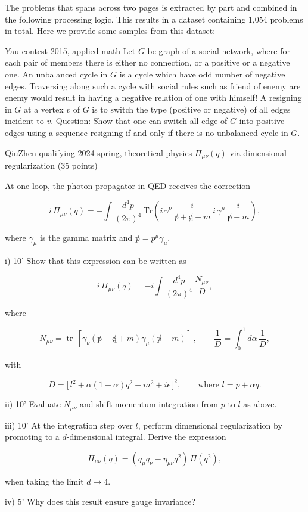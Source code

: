 \documentclass{article} %
\begin{document}
The problems that spans across two pages is extracted by part and combined in the following processing logic. This results in a dataset containing 1,054 problems in total. Here we provide some samples from this dataset:

\begin{promptbox}{Yau contest 2015, applied math}
Let $G$ be graph of a social network, where for each pair of members there is either no connection, or a positive or a negative one.  An unbalanced cycle in $G$ is a cycle which have odd number of negative edges. Traversing along such a cycle with social rules such as friend of enemy are enemy would result in having a negative relation of one with himself!  A resigning in $G$ at a vertex $v$ of $G$ is to switch the type (positive or negative) of all edges incident to $v$.  Question: Show that one can switch all edge of $G$ into positive edges using a sequence resigning if and only if there is no unbalanced cycle in $G$.
\end{promptbox}

\begin{promptbox}{QiuZhen qualifying 2024 spring, theoretical physics}
$\Pi_{\mu\nu}(q)$ via dimensional regularization (35 points)

At one-loop, the photon propagator in QED receives the correction

$$i\,\Pi_{\mu\nu}(q) = - \int \frac{d^4 p}{(2\pi)^4} \, \mathrm{Tr} \left( i\,\gamma^\nu \, \frac{i}{\not p + \not q - m} \, i\,\gamma^\mu \, \frac{i}{\not p - m} \right),$$

where $\gamma_\mu$ is the gamma matrix and $\not p = p^\mu \gamma_\mu$.

i) 10' Show that this expression can be written as

$$i\,\Pi_{\mu\nu}(q) = -i \int \frac{d^4 p}{(2\pi)^4} \, \frac{N_{\mu\nu}}{D},$$

where

$$N_{\mu\nu} = \operatorname{tr}\,[\gamma_\nu(\not p + \not q + m)\gamma_\mu(\not p - m)]\,, \qquad \frac{1}{D} = \int_0^1 d\alpha \, \frac{1}{D},$$

with

$$D = \big[\,l^2 + \alpha(1-\alpha) q^2 - m^2 + i\epsilon\,\big]^2, \qquad \text{where } l = p + \alpha q.$$

ii) 10' Evaluate $N_{\mu\nu}$ and shift momentum integration from $p$ to $l$ as above.

iii) 10' At the integration step over $l$, perform dimensional regularization by promoting to a $d$-dimensional integral. Derive the expression

$$\Pi_{\mu\nu}(q) = (q_\mu q_\nu - \eta_{\mu\nu} q^2)\,\Pi(q^2),$$

when taking the limit $d \to 4$.

iv) 5' Why does this result ensure gauge invariance?
\end{promptbox}
\end{document}
